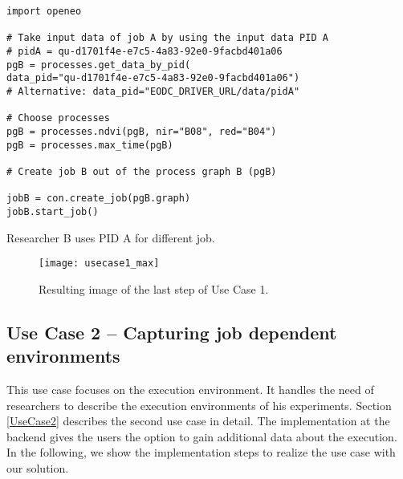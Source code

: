 \documentclass[draft,final]{vutinfth} %
\newenvironment{code}{\captionsetup{type=listing}}{}
\begin{document}
\begin{enumerate}
\begin{code}
	\begin{verbatim}
import openeo

# Take input data of job A by using the input data PID A
# pidA = qu-d1701f4e-e7c5-4a83-92e0-9facbd401a06
pgB = processes.get_data_by_pid(
data_pid="qu-d1701f4e-e7c5-4a83-92e0-9facbd401a06")
# Alternative: data_pid="EODC_DRIVER_URL/data/pidA" 

# Choose processes
pgB = processes.ndvi(pgB, nir="B08", red="B04")
pgB = processes.max_time(pgB)

# Create job B out of the process graph B (pgB)

jobB = con.create_job(pgB.graph)
jobB.start_job()
	\end{verbatim}
	\caption{Researcher B uses PID A for different job.}
	\label{lst:impl_usecase1_3}
\end{code}
	
\end{enumerate}

\begin{figure}[h]
	\centering
	\texttt{[image: usecase1\_max]}
	\caption{Resulting image of the last step of Use Case 1.}
	\label{fig:impl_usecase1_max} %
\end{figure}
	
\subsection{Use Case 2 – Capturing job dependent environments}\label{Implementation:Use Case2}
This use case focuses on the execution environment. It handles the need of researchers to describe the execution environments of his experiments. Section \ref{UseCase2} describes the second use case in detail. The implementation at the backend gives the users the option to gain additional data about the execution. In the following, we show the implementation steps to realize the use case with our solution. 
\end{document}
